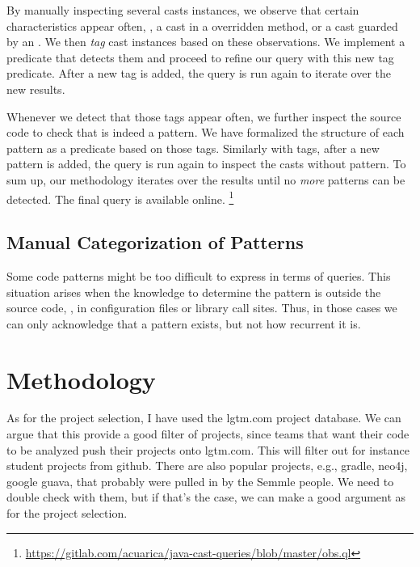 By manually inspecting several casts instances,
we observe that certain characteristics appear often, \eg,
a cast in a overridden method, or a cast guarded by an .
We then \emph{tag} cast instances based on these observations.
We implement a \ql{} predicate that detects them and proceed
to refine our query with this new tag predicate.
After a new tag is added, the query is run again to iterate over the new results.

Whenever we detect that those tags appear often,
we further inspect the source code to check that is indeed a pattern.
We have formalized the structure of each pattern as a \ql{} predicate based on those tags.
Similarly with tags, after a new pattern is added,
the query is run again to inspect the casts without pattern.
To sum up, our methodology iterates over the results until
no \emph{more} patterns can be detected.
The final \ql{} query is available online.%
\footnote{\url{https://gitlab.com/acuarica/java-cast-queries/blob/master/obs.ql}}


\subsection*{Manual Categorization of Patterns}

Some code patterns might be too difficult to
express in terms of \ql{} queries.
This situation arises when the knowledge to determine
the pattern is outside the source code,
\eg, in configuration files or library call sites.
Thus, in those cases we can only acknowledge that a pattern exists,
but not how recurrent it is.

\section{Methodology}

As for the project selection, I have used the lgtm.com project database.
We can argue that this provide a good filter of projects,
since teams that want their code to be analyzed push their projects onto lgtm.com.
This will filter out for instance student projects from github.
There are also popular projects, e.g., gradle, neo4j, google guava,
that probably were pulled in by the Semmle people.
We need to double check with them, but if that’s the case,
we can make a good argument as for the project selection.

